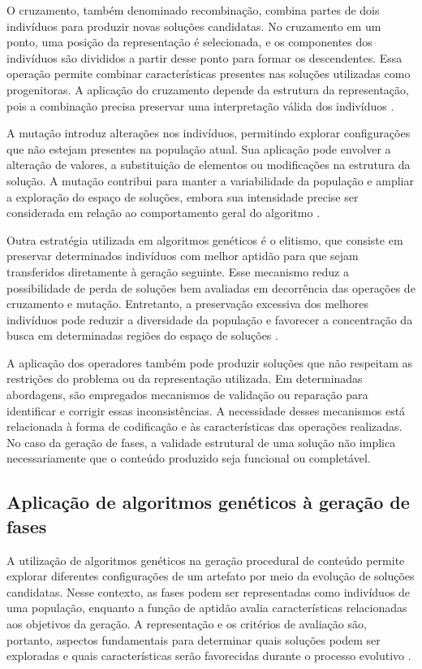 O cruzamento, também denominado recombinação,
combina partes de dois indivíduos para produzir
novas soluções candidatas. No cruzamento em um
ponto, uma posição da representação é selecionada,
e os componentes dos indivíduos são divididos
a partir desse ponto para formar os descendentes.
Essa operação permite combinar características
presentes nas soluções utilizadas como progenitoras.
A aplicação do cruzamento depende da estrutura
da representação, pois a combinação precisa
preservar uma interpretação válida dos indivíduos
\cite{Goldberg1989,Mitchell1996}.

A mutação introduz alterações nos indivíduos,
permitindo explorar configurações que não estejam
presentes na população atual. Sua aplicação pode
envolver a alteração de valores, a substituição
de elementos ou modificações na estrutura da
solução. A mutação contribui para manter a
variabilidade da população e ampliar a exploração
do espaço de soluções, embora sua intensidade
precise ser considerada em relação ao comportamento
geral do algoritmo \cite{EibenSmith2003}.

Outra estratégia utilizada em algoritmos genéticos
é o elitismo, que consiste em preservar determinados
indivíduos com melhor aptidão para que sejam
transferidos diretamente à geração seguinte.
Esse mecanismo reduz a possibilidade de perda
de soluções bem avaliadas em decorrência das
operações de cruzamento e mutação. Entretanto,
a preservação excessiva dos melhores indivíduos
pode reduzir a diversidade da população e favorecer
a concentração da busca em determinadas regiões
do espaço de soluções \cite{Goldberg1989,EibenSmith2003}.

A aplicação dos operadores também pode produzir
soluções que não respeitam as restrições do problema
ou da representação utilizada. Em determinadas
abordagens, são empregados mecanismos de validação
ou reparação para identificar e corrigir essas
inconsistências. A necessidade desses mecanismos
está relacionada à forma de codificação e às
características das operações realizadas. No caso
da geração de fases, a validade estrutural de
uma solução não implica necessariamente que
o conteúdo produzido seja funcional ou completável.

\subsection{Aplicação de algoritmos genéticos à geração de fases}

A utilização de algoritmos genéticos na geração
procedural de conteúdo permite explorar diferentes
configurações de um artefato por meio da evolução
de soluções candidatas. Nesse contexto, as fases
podem ser representadas como indivíduos de uma
população, enquanto a função de aptidão avalia
características relacionadas aos objetivos da
geração. A representação e os critérios de avaliação
são, portanto, aspectos fundamentais para determinar
quais soluções podem ser exploradas e quais
características serão favorecidas durante o
processo evolutivo \cite{Togelius2011}.

